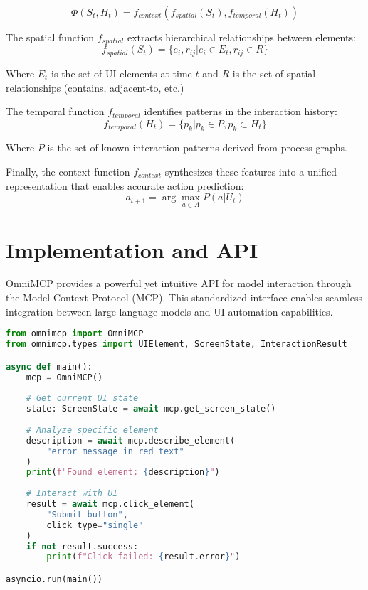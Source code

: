 \documentclass{article}
\begin{document}
\begin{equation}
\Phi(S_t, H_t) = f_{context}(f_{spatial}(S_t), f_{temporal}(H_t))
\end{equation}

The spatial function $f_{spatial}$ extracts hierarchical relationships between elements:
\begin{equation}
f_{spatial}(S_t) = \{e_i, r_{ij} | e_i \in E_t, r_{ij} \in R\}
\end{equation}

Where $E_t$ is the set of UI elements at time $t$ and $R$ is the set of spatial relationships (contains, adjacent-to, etc.)

The temporal function $f_{temporal}$ identifies patterns in the interaction history:
\begin{equation}
f_{temporal}(H_t) = \{p_k | p_k \in P, p_k \subset H_t\}
\end{equation}

Where $P$ is the set of known interaction patterns derived from process graphs.

Finally, the context function $f_{context}$ synthesizes these features into a unified representation that enables accurate action prediction:
\begin{equation}
a_{t+1} = \arg\max_{a \in A} P(a | U_t)
\end{equation}

\section{Implementation and API}

OmniMCP provides a powerful yet intuitive API for model interaction through the Model Context Protocol (MCP). This standardized interface enables seamless integration between large language models and UI automation capabilities.

\begin{lstlisting}[language=Python]
from omnimcp import OmniMCP
from omnimcp.types import UIElement, ScreenState, InteractionResult

async def main():
    mcp = OmniMCP()
    
    # Get current UI state
    state: ScreenState = await mcp.get_screen_state()
    
    # Analyze specific element
    description = await mcp.describe_element(
        "error message in red text"
    )
    print(f"Found element: {description}")
    
    # Interact with UI
    result = await mcp.click_element(
        "Submit button",
        click_type="single"
    )
    if not result.success:
        print(f"Click failed: {result.error}")

asyncio.run(main())
\end{lstlisting}
\end{document}
